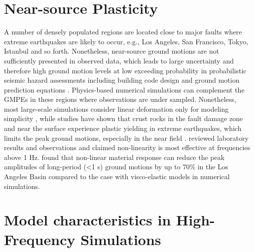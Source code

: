\section{Near-source Plasticity}

A number of densely populated regions are located close to major faults where extreme earthquakes are likely to occur, e.g., Los Angeles, San Francisco, Tokyo, Istanbul and so forth. Nonetheless, near-source ground motions are not sufficiently presented in observed data, which leads to large uncertainty and therefore high ground motion levels at low exceeding probability in probabilistic seismic hazard assessments including building code design and ground motion prediction equations . Physics-based numerical simulations can complement the GMPEs in these regions where observations are under sampled. Nonetheless, most large-scale simulations consider linear deformation only for modeling simplicity \citep{olsen20083d,molnar2014earthquake}, while studies have shown that crust rocks in the fault damage zone and near the surface experience plastic yielding in extreme earthquakes, which limits the peak ground motions, especially in the near field \citep{andrewsPhysicalLimitsGround2007,ma2008physical,duanSensitivityStudyPhysical2010,templetonDynamicRuptureBranched2010,dunhamEarthquakeRupturesStrongly2011}. \citet{fieldNonlinearSiteResponse1998} reviewed laboratory results and observations and claimed non-linearity is most effective at frequencies above 1 Hz. \citet{gravesBroadbandSimulationsSouthern2008} found that non-linear material response can reduce the peak amplitudes of long-period (<1 s) ground motions by up to 70\% in the Los Angeles Basin compared to the case with visco-elastic models in numerical simulations.



\section{Model characteristics in High-Frequency Simulations}

